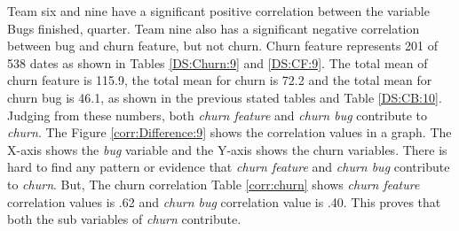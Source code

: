 \documentclass[UKenglish]{ifimaster}  %
\begin{document}
Team six and nine have a significant positive correlation between the variable Bugs finished, quarter. Team nine also has a significant negative correlation between bug and churn feature, but not churn. Churn feature represents 201 of 538 dates as shown in Tables \ref{DS:Churn:9} and \ref{DS:CF:9}.  The total mean of churn feature is 115.9, the total mean for churn is 72.2 and the total mean for churn bug is 46.1, as shown in the previous stated tables and Table \ref{DS:CB:10}. Judging from these numbers, both \textit{churn feature} and \textit{churn bug} contribute to \textit{churn}. The Figure \ref{corr:Difference:9} shows the correlation values in a graph. The X-axis shows the \textit{bug} variable and the Y-axis shows the churn variables. There is hard to find any pattern or evidence that \textit{churn feature} and \textit{churn bug} contribute to \textit{churn}. But, The churn correlation Table \ref{corr:churn} shows \textit{churn feature} correlation values is .62 and \textit{churn bug} correlation value is .40. This proves that both the sub variables of \textit{churn} contribute. 
\end{document}
